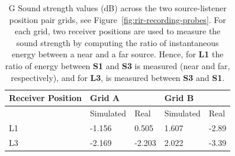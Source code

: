 \begin{table}[htb]
    \centering
    \caption[Ray tracing testing --- sound strength computed across source-listener positions]{G Sound strength values (dB) across the two source-listener position pair grids, see Figure~\ref{fig:rir-recording-probes}. For each grid, two receiver positions are used to measure the sound strength by computing the ratio of instantaneous energy between a near and a far source. Hence, for \textbf{L1} the ratio of energy between \textbf{S1} and \textbf{S3} is measured (near and far, respectively), and for \textbf{L3}, is measured between \textbf{S3} and  \textbf{S1}.}\label{tab:g-scores}
    \begin{tabular}{@{}lllll@{}}
    \toprule
    Receiver Position & \multicolumn{2}{l}{Grid A} & \multicolumn{2}{l}{Grid B} \\ \midrule
                      & Simulated     & Real       & Simulated      & Real      \\
    L1                & -1.156        & 0.505      & 1.607          & -2.89     \\
    L3                & -2.169        & -2.203     & 2.022          & -3.39     \\ \bottomrule
    \end{tabular}%
\end{table}